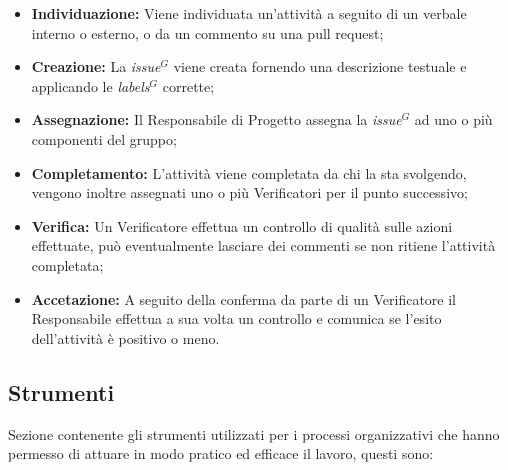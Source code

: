         \begin{itemize}
            \item \textbf{Individuazione:} Viene individuata un'attività a seguito di un verbale interno o esterno, o da un commento su una pull request;
            \item \textbf{Creazione:} La \emph{issue}$^{G}$ viene creata fornendo una descrizione testuale e applicando le \emph{labels}$^{G}$ corrette;
            \item \textbf{Assegnazione:} Il Responsabile di Progetto assegna la \emph{issue}$^{G}$ ad uno o più componenti del gruppo;
            \item \textbf{Completamento:} L'attività viene completata da chi la sta svolgendo, vengono inoltre assegnati uno o più Verificatori per il punto successivo;
            \item \textbf{Verifica:} Un Verificatore effettua un controllo di qualità sulle azioni effettuate, può eventualmente lasciare dei commenti se non ritiene l'attività completata;
            \item \textbf{Accetazione:} A seguito della conferma da parte di un Verificatore il Responsabile effettua a sua volta un controllo e comunica se l'esito dell'attività è positivo o meno.
        \end{itemize}
       
        



        \subsection{Strumenti}

        Sezione contenente gli strumenti utilizzati per i processi organizzativi che hanno permesso di attuare in modo pratico ed efficace il lavoro, questi sono:

